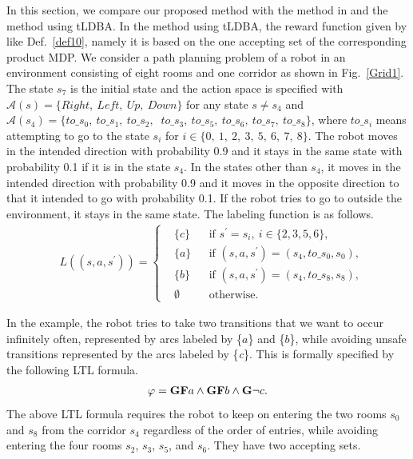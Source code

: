 \documentclass[letterpaper, 10 pt, conference]{ieeeconf}  %
\begin{document}
In this section, we compare our proposed method with the method in \cite{HAK2019,HKAKPL2019} and the method using tLDBA. In the method using tLDBA, the reward function given by like Def.\ \ref{def10}, namely it is based on the one accepting set of the corresponding product MDP.
We consider a path planning problem of a robot in an environment consisting of eight rooms and one corridor as shown in Fig.\ \ref{Grid1}. The state $s_7$ is the initial state and the action space is specified with $\mathcal{A}(s) = \{ Right,\ Left,\ Up,\ Down \}$ for any state $s \neq s_4$ and $\mathcal{A}(s_4) = \{ to\_s_0,\ to\_s_1,\ to\_s_2,$ $\ to\_s_3,\ to\_s_5,\ to\_s_6,\ to\_s_7,\ to\_s_8 \}$, where $to\_s_i$ means attempting to go to the state $s_i$ for $i \in \{0,\ 1,\ 2,\ 3,\ 5,\ 6,\ 7,\ 8 \}$. The robot moves in the intended direction with probability 0.9 and it stays in the same state with probability 0.1 if it is in the state $s_4$. In the states other than $s_4$, it moves in the intended direction with probability 0.9 and it moves in the opposite direction to that it intended to go with probability 0.1. If the robot tries to go to outside the environment, it stays in the same state. The labeling function is as follows.
\begin{align*}
      & L((s, a, s^{\prime})) =
      \left\{
      \begin{aligned}
        & \{ c \} &  & \text{if }s^{\prime} = s_i,\ i \in \{ 2,3,5,6 \}, \nonumber \\
        & \{ a \} &  & \text{if }(s,a,s^{\prime})=(s_4,to\_s_0,s_0), \nonumber \\
        & \{ b \} &  & \text{if }(s,a,s^{\prime})=(s_4,to\_s_8, s_8), \nonumber \\
        & \emptyset &  & \text{otherwise}.
      \end{aligned}
      \right.
    \end{align*}

In the example, the robot tries to take two transitions that we want to occur infinitely often, represented by arcs labeled by \{$a$\} and \{$b$\}, while avoiding unsafe transitions represented by the arcs labeled by \{{\it c}\}. This is formally specified by the following LTL formula.
\begin{align*}
  \varphi = \text{{\bf GF}}a \wedge \text{{\bf GF}}b \wedge \text{{\bf G}}\neg c.
\end{align*}
The above LTL formula requires the robot to keep on entering the two rooms $s_0$ and $s_8$ from the corridor $s_4$ regardless of the order of entries, while avoiding entering the four rooms $s_2$, $s_3$, $s_5$, and $s_6$. They have two accepting sets.
\end{document}
